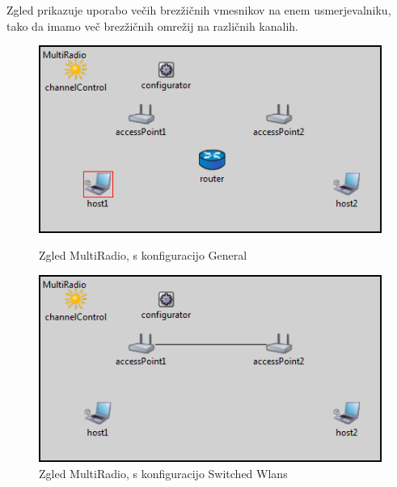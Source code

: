 \documentclass[a4paper,11pt]{article}
\begin{document}
Zgled prikazuje uporabo večih brezžičnih vmesnikov na enem usmerjevalniku, tako da imamo več brezžičnih omrežij na različnih kanalih.


\begin{figure}[htbp]
    \begin{center}
        \includegraphics[scale=0.8]{img/zgledi/multiradio_general.png}
        \label{image:multiradiogeneral}
        \caption{Zgled MultiRadio, s konfiguracijo General}
    \end{center}
\end{figure}

\begin{figure}[htbp]
    \begin{center}
        \includegraphics[scale=0.8]{img/zgledi/multiradio_switched.png}
        \caption{Zgled MultiRadio, s konfiguracijo Switched Wlans}
        \label{image:multiradioswitched}
    \end{center}
\end{figure}
\end{document}
